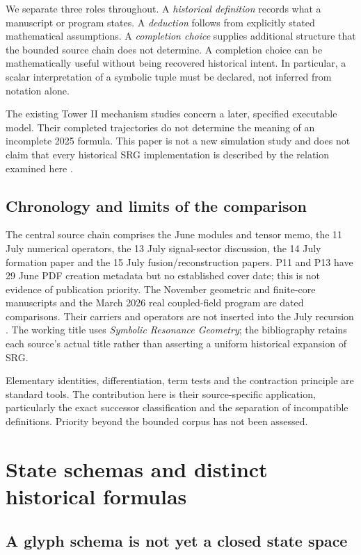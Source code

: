 \documentclass[11pt,a4paper]{article}
\theoremstyle{definition}
\numberwithin{equation}{section}
\begin{document}
We separate three roles throughout. A \emph{historical definition} records what
a manuscript or program states. A \emph{deduction} follows from explicitly
stated mathematical assumptions. A \emph{completion choice} supplies additional
structure that the bounded source chain does not determine. A completion
choice can be mathematically useful without being recovered historical intent.
In particular, a scalar interpretation of a symbolic tuple must be declared,
not inferred from notation alone.

The existing Tower II mechanism studies concern a later, specified executable
model. Their completed trajectories do not determine the meaning of an
incomplete 2025 formula. This paper is not a new simulation study and does not
claim that every historical SRG implementation is described by the relation
examined here \cite{F01}.


\subsection{Chronology and limits of the comparison}

The central source chain comprises the June modules and tensor memo,
the 11 July numerical operators, the 13 July signal-sector discussion,
the 14 July formation paper and the 15 July fusion/reconstruction papers.
P11 and P13 have 29 June PDF creation metadata but no established cover
date; this is not evidence of publication priority.
The November geometric and finite-core manuscripts and the March 2026
real coupled-field program are dated comparisons. Their carriers and
operators are not inserted into the July recursion
\cite{P01,P05,P06,P08,P11,P13,P14,P15,Infinity}.
The working title uses \emph{Symbolic Resonance Geometry}; the bibliography
retains each source's actual title rather than asserting a uniform
historical expansion of SRG.

Elementary identities, differentiation, term tests and the contraction
principle are standard tools. The contribution here is their source-specific
application, particularly the exact successor classification and the
separation of incompatible definitions. Priority beyond the bounded corpus
has not been assessed.

\section{State schemas and distinct historical formulas}\label{sec:state}

\subsection{A glyph schema is not yet a closed state space}
\end{document}
